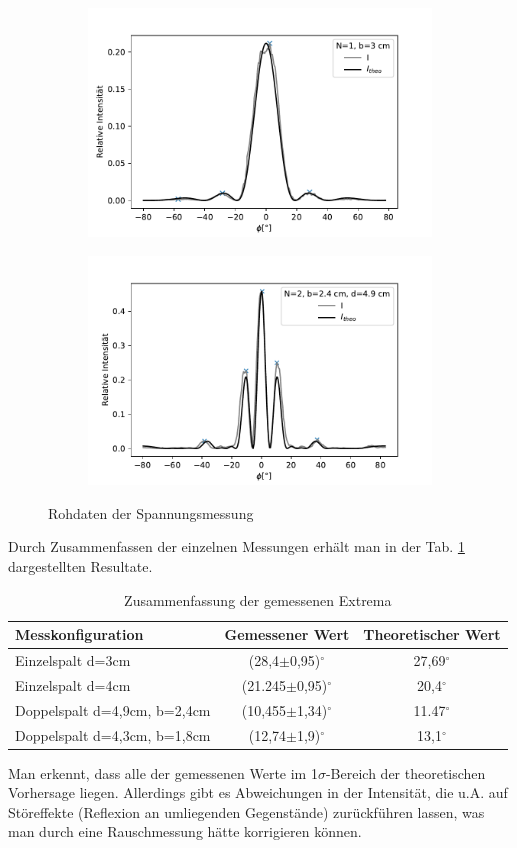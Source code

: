 \documentclass[12pt,a4paper]{article}
\begin{document}
\begin{figure}[H]
	\centering
	\begin{subfigure}{.5\textwidth}
		\centering
		\includegraphics[width=0.9\linewidth]{Rohdaten/Images/einzelspalt_3_3}
	\end{subfigure}%
	\begin{subfigure}{.5\textwidth}
		\centering
		\includegraphics[width=0.9\linewidth]{Rohdaten/Images/doppelspalt_2}
	\end{subfigure}
	\caption{Rohdaten der Spannungsmessung}
	\label{fig:daten_mit_theo}
\end{figure}
Durch Zusammenfassen der einzelnen Messungen erhält man in der Tab. \ref{tab:messwerte} dargestellten Resultate.\\
\begin{table}[H]
	\centering
	\begin{tabular}{|l|c|c|}
		\hline 
		Messkonfiguration& Gemessener Wert & Theoretischer Wert \\ 
		\hline 
		Einzelspalt d=3cm &(28,4$\pm$0,95)$^\circ$&27,69$^\circ$ \\ 
		\hline 
		Einzelspalt d=4cm &(21.245$\pm$0,95)$^\circ$ &20,4$^\circ$ \\ 
		\hline 
		Doppelspalt d=4,9cm, b=2,4cm&(10,455$\pm$1,34)$^\circ$ &11.47$^\circ$ \\ 
		\hline 
		Doppelspalt d=4,3cm, b=1,8cm&(12,74$\pm$1,9)$^\circ$ &13,1$^\circ$ \\
		\hline 
	\end{tabular}
	\label{tab:messwerte}
	\caption{Zusammenfassung der gemessenen Extrema} 
\end{table}
Man erkennt, dass alle der gemessenen Werte im 1$\sigma$-Bereich der theoretischen Vorhersage liegen. Allerdings gibt es Abweichungen in der Intensität, die u.A. auf Störeffekte (Reflexion an umliegenden Gegenstände) zurückführen lassen, was man durch eine Rauschmessung hätte korrigieren können.
\end{document}
